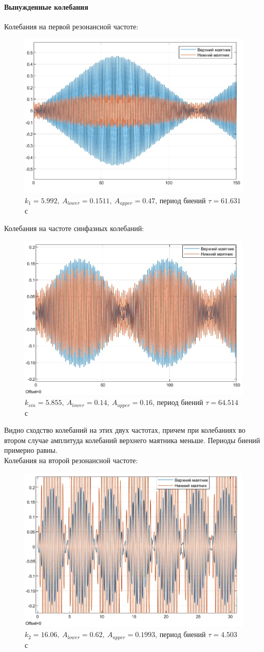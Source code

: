 \documentclass{article}
\begin{document}
	\paragraph*{Вынужденные колебания\\}
	Колебания на первой резонансной частоте:
	\begin{figure}[H]
		\centering
		\includegraphics[width=0.7\linewidth]{k1}
		\caption{$k_1 = 5.992,\ A_{lower} = 0.1511,\ A_{upper} = 0.47$, период биений $\tau = 61.631$ с}
		\label{fig:k1}
	\end{figure}
	Колебания на частоте синфазных колебаний:
	\begin{figure}[H]
		\centering
		\includegraphics[width=0.7\linewidth]{ksin}
		\caption{$k_{sin} = 5.855,\ A_{lower} = 0.14,\ A_{upper} = 0.16$, период биений $\tau = 64.514$ с}
		\label{fig:ksin}
	\end{figure}
	Видно сходство колебаний на этих двух частотах, причем при колебаниях во втором случае амплитуда колебаний верхнего маятника меньше. Периоды биений примерно равны.\\
	Колебания на второй резонансной частоте:
	\begin{figure}[H]
		\centering
		\includegraphics[width=0.7\linewidth]{k2}
		\caption{$k_2 = 16.06,\ A_{lower} = 0.62,\ A_{upper} = 0.1993$, период биений $\tau = 4.503$ с}
		\label{fig:k2}
	\end{figure}
\end{document}
